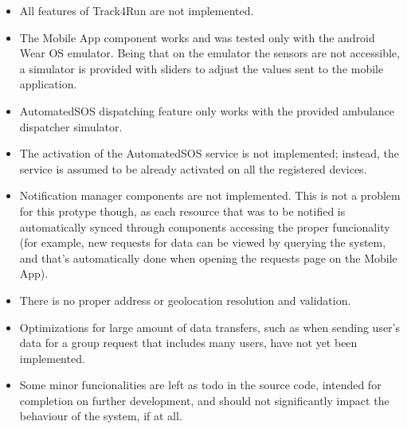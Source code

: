 \documentclass[../main.tex]{subfiles}
\begin{document}
\begin{itemize}
	\item All features of Track4Run are not implemented.
	\item The Mobile App component works and was tested only with the android Wear OS emulator. Being that on the emulator the sensors are not accessible, a simulator is provided with sliders to adjust the values sent to the mobile application.
	\item AutomatedSOS dispatching feature only works with the provided ambulance dispatcher simulator.
	\item The activation of the AutomatedSOS service is not implemented; instead, the service is assumed to be already activated on all the registered devices.
	\item Notification manager components are not implemented. This is not a problem for this protype though, as each resource that was to be notified is automatically synced through components accessing the proper funcionality (for example, new requests for data can be viewed by querying the system, and that's automatically done when opening the requests page on the Mobile App).
	\item There is no proper address or geolocation resolution and validation.
	\item Optimizations for large amount of data transfers, such as when sending user's data for a group request that includes many users, have not yet been implemented.
	\item Some minor funcionalities are left as todo in the source code, intended for completion on further development, and should not significantly impact the behaviour of the system, if at all.
\end{itemize}
\end{document}
